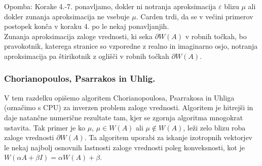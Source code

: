 \documentclass[12pt,a4paper]{amsart}
\theoremstyle{definition}
\theoremstyle{plain}
\begin{document}
Opomba: Korake 4.-7. ponavljamo, dokler ni notranja aproksimacija $\varepsilon$ blizu $\mu$ ali dokler zunanja aproksimacija ne vsebuje $\mu$. Carden trdi, da se v večini primerov postopek konča v koraku 4. po le nekaj ponavljanjih.\\
Zunanja aproksimacija zaloge vrednosti, ki seka $\partial W(A)$ v robnih točkah, bo pravokotnik, katerega stranice so vzporedne z realno in imaginarno osjo,  notranja aproksimacija pa štirikotnik z oglišči v robnih točkah $\partial W(A)$.
\subsubsection{Chorianopoulos, Psarrakos in Uhlig.}
V tem razdelku opišemo algoritem Chorianopoulosa, Psarrakosa in Uhliga (označimo s CPU) za inverzen problem zaloge vrednosti.
Algoritem je hitrejši in daje natančne numerične rezultate tam, kjer se zgornja algoritma mnogokrat ustavita. Tak primer je ko $\mu$, $\mu \in W(A)$ ali $\mu \not\in W(A)$, leži zelo blizu roba zaloge vrednosti $\partial W(A)$. Ta algoritem uporabi za iskanje izotropnih vektorjev le nekaj najbolj osnovnih lastnosti zaloge vrednosti poleg konveksnosti, kot je $W(\alpha A +\beta I)=\alpha W(A) +\beta$.\\
\end{document}
